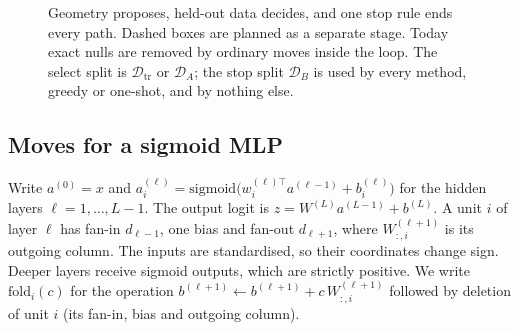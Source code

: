 \documentclass[11pt,a4paper]{article}
\theoremstyle{definition}
\newcommand{\D}{\mathcal{D}}
\newcommand{\Dtr}{\D_{\mathrm{tr}}}
\newcommand{\DA}{\D_{A}}
\newcommand{\DB}{\D_{B}}
\begin{document}
\begin{figure}[t]
\caption{Geometry proposes, held-out data decides, and one stop rule ends every path.
Dashed boxes are planned as a separate stage. Today exact nulls are removed by ordinary
moves inside the loop. The select split is $\Dtr$ or $\DA$; the stop split $\DB$ is
used by every method, greedy or one-shot, and by nothing else.}
\label{fig:method}
\end{figure}

\subsection{Moves for a sigmoid MLP}
\label{sec:moves-mlp}

Write $a^{(0)}=x$ and $a^{(\ell)}_i=\mathrm{sigmoid}\big(w^{(\ell)\top}_{i}a^{(\ell-1)}
+b^{(\ell)}_i\big)$ for the hidden layers $\ell=1,\dots,L-1$. The output logit is
$z=W^{(L)}a^{(L-1)}+b^{(L)}$. A unit $i$ of layer $\ell$ has fan-in $d_{\ell-1}$, one
bias and fan-out $d_{\ell+1}$, where $W^{(\ell+1)}_{:,i}$ is its outgoing column. The
inputs are standardised, so their coordinates change sign. Deeper layers receive
sigmoid outputs, which are strictly positive. We write $\mathrm{fold}_i(c)$ for the
operation $b^{(\ell+1)}\leftarrow b^{(\ell+1)}+c\,W^{(\ell+1)}_{:,i}$ followed by
deletion of unit $i$ (its fan-in, bias and outgoing column).
\end{document}
